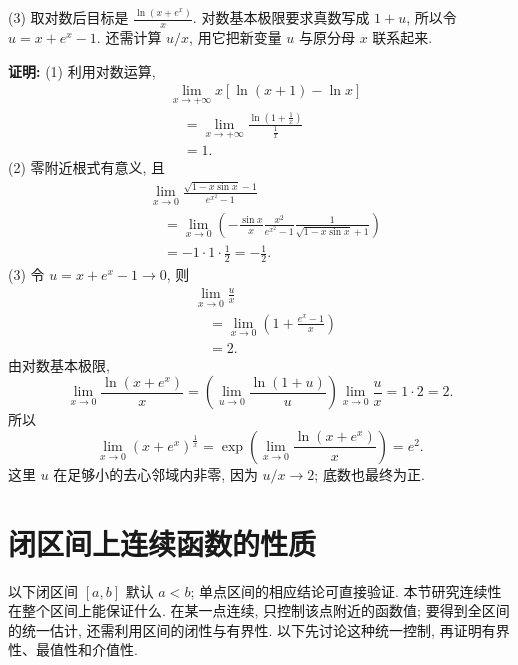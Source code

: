 \documentclass[UTF8,openany]{ctexbook}
\theoremstyle{chinesetextbook}
\newenvironment{cnproof}{\par\indent\textbf{证明:} \ignorespaces}{\par}
\begin{document}
(3) 取对数后目标是 $\displaystyle\frac{\ln(x+e^x)}x$. 对数基本极限要求真数写成 $1+u$, 所以令 $u=x+e^x-1$. 还需计算 $u/x$, 用它把新变量 $u$ 与原分母 $x$ 联系起来.
\begin{cnproof}
(1) 利用对数运算,
\[
\begin{aligned}
&\lim_{x\to+\infty}x[\ln(x+1)-\ln x]\\
&\quad=\lim_{x\to+\infty}\frac{\ln(1+\frac1x)}{\frac1x}\\
&\quad=1.
\end{aligned}
\]
(2) 零附近根式有意义, 且
\[
\begin{aligned}
&\lim_{x\to0}\frac{\sqrt{1-x\sin x}-1}{e^{x^2}-1}\\
&\quad=\lim_{x\to0}\left(-\frac{\sin x}{x}\frac{x^2}{e^{x^2}-1}\frac1{\sqrt{1-x\sin x}+1}\right)\\
&\quad=-1\cdot1\cdot\frac12=-\frac12.
\end{aligned}
\]
(3) 令 $u=x+e^x-1\to0$, 则
\[
\begin{aligned}
&\lim_{x\to0}\frac ux\\
&\quad=\lim_{x\to0}\left(1+\frac{e^x-1}x\right)\\
&\quad=2.
\end{aligned}
\]
由对数基本极限,
\[
\lim_{x\to0}\frac{\ln(x+e^x)}x
=\left(\lim_{u\to0}\frac{\ln(1+u)}u\right)\lim_{x\to0}\frac ux=1\cdot2=2.
\]
所以
\[
\lim_{x\to0}(x+e^x)^{\frac1x}
=\exp\left(\lim_{x\to0}\frac{\ln(x+e^x)}x\right)=e^2.
\] 这里 $u$ 在足够小的去心邻域内非零, 因为 $u/x\to2$; 底数也最终为正.
\end{cnproof}

\section{闭区间上连续函数的性质}
以下闭区间 $[a,b]$ 默认 $a<b$; 单点区间的相应结论可直接验证. 本节研究连续性在整个区间上能保证什么. 在某一点连续, 只控制该点附近的函数值; 要得到全区间的统一估计, 还需利用区间的闭性与有界性. 以下先讨论这种统一控制, 再证明有界性、最值性和介值性.
\end{document}
